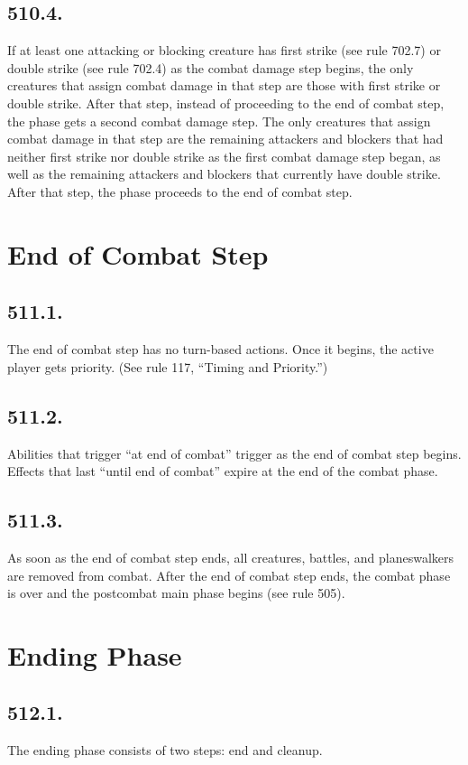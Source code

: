 \subsection*{510.4.}
If at least one attacking or blocking creature has first strike (see rule 702.7) or double strike (see rule 702.4) as the combat damage step begins, the only creatures that assign combat damage in that step are those with first strike or double strike. After that step, instead of proceeding to the end of combat step, the phase gets a second combat damage step. The only creatures that assign combat damage in that step are the remaining attackers and blockers that had neither first strike nor double strike as the first combat damage step began, as well as the remaining attackers and blockers that currently have double strike. After that step, the phase proceeds to the end of combat step.

\section{End of Combat Step}
\subsection*{511.1.}
The end of combat step has no turn-based actions. Once it begins, the active player gets priority. (See rule 117, “Timing and Priority.”)

\subsection*{511.2.}
Abilities that trigger “at end of combat” trigger as the end of combat step begins. Effects that last “until end of combat” expire at the end of the combat phase.

\subsection*{511.3.}
As soon as the end of combat step ends, all creatures, battles, and planeswalkers are removed from combat. After the end of combat step ends, the combat phase is over and the postcombat main phase begins (see rule 505).

\section{Ending Phase}
\subsection*{512.1.}
The ending phase consists of two steps: end and cleanup.

